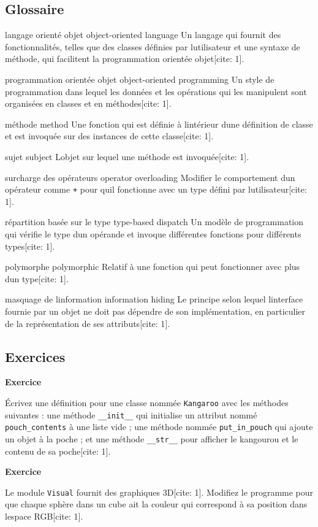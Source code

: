 \hypertarget{glossaire}{%
\subsection{Glossaire}\label{glossaire}}

langage orienté objet object-oriented language Un langage qui fournit
des fonctionnalités, telles que des classes définies par
l\textquotesingle utilisateur et une syntaxe de méthode, qui facilitent
la programmation orientée objet{[}cite: 1{]}.

programmation orientée objet object-oriented programming Un style de
programmation dans lequel les données et les opérations qui les
manipulent sont organisées en classes et en méthodes{[}cite: 1{]}.

méthode method Une fonction qui est définie à
l\textquotesingle intérieur d\textquotesingle une définition de classe
et est invoquée sur des instances de cette classe{[}cite: 1{]}.

sujet subject L\textquotesingle objet sur lequel une méthode est
invoquée{[}cite: 1{]}.

surcharge des opérateurs operator overloading Modifier le comportement
d\textquotesingle un opérateur comme \texttt{+} pour
qu\textquotesingle il fonctionne avec un type défini par
l\textquotesingle utilisateur{[}cite: 1{]}.

répartition basée sur le type type-based dispatch Un modèle de
programmation qui vérifie le type d\textquotesingle un opérande et
invoque différentes fonctions pour différents types{[}cite: 1{]}.

polymorphe polymorphic Relatif à une fonction qui peut fonctionner avec
plus d\textquotesingle un type{[}cite: 1{]}.

masquage de l\textquotesingle information information hiding Le principe
selon lequel l\textquotesingle interface fournie par un objet ne doit
pas dépendre de son implémentation, en particulier de la représentation
de ses attributs{[}cite: 1{]}.

\hypertarget{exercices}{%
\subsection{Exercices}\label{exercices}}

\textbf{Exercice}

Écrivez une définition pour une classe nommée \texttt{Kangaroo} avec les
méthodes suivantes : une méthode \texttt{\_\_init\_\_} qui initialise un
attribut nommé \texttt{pouch\_contents} à une liste vide ; une méthode
nommée \texttt{put\_in\_pouch} qui ajoute un objet à la poche ; et une
méthode \texttt{\_\_str\_\_} pour afficher le kangourou et le contenu de
sa poche{[}cite: 1{]}.

\textbf{Exercice}

Le module \texttt{Visual} fournit des graphiques 3D{[}cite: 1{]}.
Modifiez le programme pour que chaque sphère dans un cube ait la couleur
qui correspond à sa position dans l\textquotesingle espace RGB{[}cite:
1{]}.
